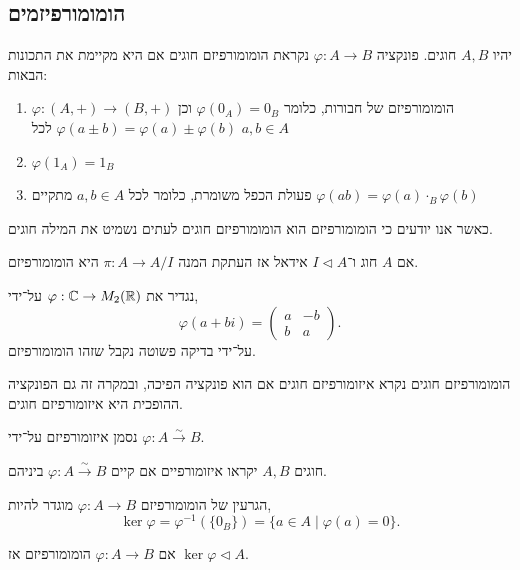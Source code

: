 \subsection{הומומורפיזמים}
\begin{definition}
	יהיו $A, B$ חוגים.
	פונקציה $\varphi : A \to B$ נקראת הומומורפיזם חוגים אם היא מקיימת את התכונות הבאות:
	\begin{enumerate}
		\item $\varphi : (A, +) \to (B, +)$ הומומורפיזם של חבורות, כלומר $\varphi(0_A) = 0_B$ וכן $\varphi(a \pm b) = \varphi(a) \pm \varphi(b)$ לכל $a, b \in A$
		\item $\varphi(1_A) = 1_B$
		\item פעולת הכפל משומרת, כלומר לכל $a, b \in A$ מתקיים $\varphi(a b) = \varphi(a) \cdot_B \varphi(b)$
	\end{enumerate}
\end{definition}
כאשר אנו יודעים כי הומומורפיזם הוא הומומורפיזם חוגים לעתים נשמיט את המילה חוגים.
\begin{example}
	אם $A$ חוג ו־$I \triangleleft A$ אידאל אז העתקת המנה $\pi : A \to A / I$ היא הומומורפיזם.
\end{example}
\begin{example}
	נגדיר את $\varphi : \mathbb{C} \to M_2(\mathbb{R})$ על־ידי,
	\[
		\varphi(a + b i)
		= \begin{pmatrix}
			a & -b \\
			b & a
		\end{pmatrix}
	.\]
	על־ידי בדיקה פשוטה נקבל שזהו הומומורפיזם.
\end{example}
\begin{definition}
	הומומורפיזם חוגים נקרא איזומורפיזם חוגים אם הוא פונקציה הפיכה, ובמקרה זה גם הפונקציה ההופכית היא איזומורפיזם חוגים.
\end{definition}
\begin{notation}
	נסמן איזומורפיזם על־ידי $\varphi : A \xrightarrow{\sim} B$.
\end{notation}
\begin{definition}
	חוגים $A, B$ יקראו איזומורפיים אם קיים $\varphi : A \xrightarrow{\sim} B$ ביניהם.
\end{definition}
\begin{definition}[גרעין]
	הגרעין של הומומורפיזם $\varphi : A \to B$ מוגדר להיות,
	\[
		\ker \varphi
		= \varphi^{-1}(\{ 0_B \})
		= \{ a \in A \mid \varphi(a) = 0 \}
	.\]
\end{definition}
\begin{proposition}
	אם $\varphi : A \to B$ הומומורפיזם אז $\ker \varphi \triangleleft A$.
\end{proposition}
